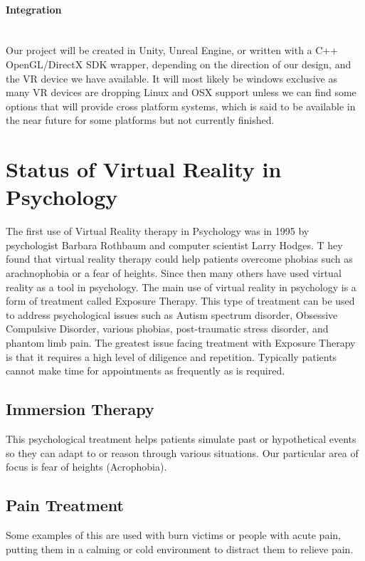 \documentclass[a4paper,10pt,twoside]{article}
\begin{document}
	\paragraph{Integration} ~\\ Our project will be created in Unity, Unreal Engine, or written with a C++ OpenGL/DirectX SDK wrapper, depending on the direction of our design, and the VR device we have available. It will most likely be windows exclusive as many VR devices are dropping Linux and OSX support unless we can find some options that will provide cross platform systems, which is said to be available in the near future for some platforms but not currently finished.  
	
	\pagebreak
	
	\section{Status of Virtual Reality in Psychology}
	The first use of Virtual Reality therapy in Psychology was in 1995 by psychologist Barbara Rothbaum and computer scientist Larry Hodges. T
	hey found that virtual reality therapy could help patients overcome phobias such as arachnophobia or a fear of heights. Since then many others 
	have used virtual reality as a tool in psychology. The main use of virtual reality in psychology is a form of treatment called Exposure Therapy. 
	This type of treatment can be used to address psychological issues such as Autism spectrum disorder, Obsessive Compulsive Disorder, various phobias, 
	post-traumatic stress disorder, and phantom limb pain. The greatest issue facing treatment with Exposure Therapy is that it requires a high level of diligence and
	repetition. Typically patients cannot make time for appointments as frequently as is required.
	
	\subsection{Immersion Therapy}
	This psychological treatment helps patients simulate past or hypothetical events so they can adapt to or reason through
	various situations. Our particular area of focus is fear of heights (Acrophobia).
	\subsection{Pain Treatment}
	Some examples of this are used with burn victims or people with acute pain, putting them in a calming or cold environment to distract them to relieve pain.
\end{document}
